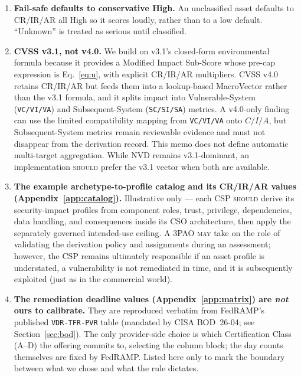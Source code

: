 \documentclass[11pt]{article}
\newcommand{\code}[1]{\texttt{#1}}
\newcommand{\rfckw}[1]{\textsc{#1}}
\begin{document}
\begin{enumerate}[leftmargin=1.7em]
  component. The preferred derivation retains confirmed NIST SP~800-60 information
  types; the simpler \code{min(SSO, ASO)} vector form is a documented
  approximation. An omitted ceiling preserves uncapped, conservative compatibility
  behavior but is not an evidenced agency-specific derivation.
\item \textbf{Fail-safe defaults to conservative High.} An unclassified asset defaults
  to CR/IR/AR all High so it scores loudly, rather than to a low default. ``Unknown''
  is treated as serious until classified.
\item \textbf{CVSS v3.1, not v4.0.} We build on v3.1's closed-form environmental
  formula because it provides a Modified Impact Sub-Score whose pre-cap expression
  is Eq.~\ref{eq:u}, with
  explicit CR/IR/AR multipliers. CVSS v4.0 retains CR/IR/AR but feeds them into a
  lookup-based MacroVector rather than the v3.1 formula, and it splits impact into
  Vulnerable-System (\code{VC/VI/VA}) and Subsequent-System (\code{SC/SI/SA})
  metrics. A v4.0-only finding can use the limited compatibility mapping from
  \code{VC/VI/VA} onto $C/I/A$, but Subsequent-System metrics remain reviewable
  evidence and must not disappear from the derivation record. This memo does not
  define automatic multi-target aggregation. While NVD remains v3.1-dominant, an
  implementation \rfckw{should} prefer the v3.1 vector when both are available.
\item \textbf{The example archetype-to-profile catalog and its CR/IR/AR values
  (Appendix~\ref{app:catalog}).} Illustrative only --- each CSP \rfckw{should} derive
  its security-impact profiles from component roles, trust, privilege,
  dependencies, data handling, and consequences inside its CSO architecture, then
  apply the separately governed intended-use ceiling. A 3PAO \rfckw{may} take on the
  role of validating the derivation policy and assignments during an assessment;
  however, the CSP remains ultimately responsible if an asset profile is
  understated, a vulnerability is not
  remediated in time, and it is subsequently exploited (just as in the 
  commercial world).
\item \textbf{The remediation deadline values (Appendix~\ref{app:matrix}) are
  \emph{not} ours to calibrate.} They are reproduced verbatim from FedRAMP's published
  \texttt{VDR-TFR-PVR} table (mandated by CISA BOD~26-04; see Section~\ref{sec:bod}).
  The only provider-side choice is which Certification Class (A--D) the offering
  commits to, selecting the column block; the day counts themselves are fixed by
  FedRAMP. Listed here only to mark the boundary between what we chose and what the
  rule dictates.
\end{enumerate}
\end{document}
